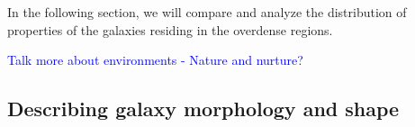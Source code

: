 \documentclass[twocolumn,useAMS,usenatbib]{mn2e}
\newcommand{\rachel}[1]{{\textcolor{red}{#1}}}
\newcommand{\arun}[1]{{\textcolor{blue}{#1}}}
\begin{document}
In the following section, we will compare and analyze the distribution of properties of the galaxies residing in the overdense regions.

\arun{Talk more about environments - Nature and nurture?}

\subsection{Describing galaxy morphology and shape}
\label{sub:axisratio}

% 
\end{document}
